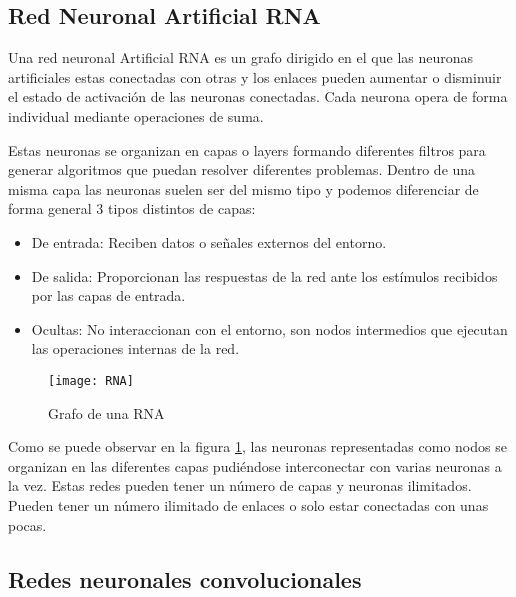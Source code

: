 \subsection{Red Neuronal Artificial RNA}

Una red neuronal Artificial RNA es un grafo dirigido en el que las neuronas artificiales estas conectadas con otras y los enlaces pueden aumentar o disminuir el estado de activación de las neuronas conectadas. Cada neurona opera de forma individual mediante operaciones de suma.\cite{wiki:redesNeuronalesArtificiales}

Estas neuronas se organizan en capas o layers formando diferentes filtros para generar algoritmos que puedan resolver diferentes problemas. Dentro de una misma capa las neuronas suelen ser del mismo tipo y podemos diferenciar de forma general 3 tipos distintos de capas:

\begin{itemize}
	\item{De entrada}: Reciben datos o señales externos del entorno.
	\item{De salida}: Proporcionan las respuestas de la red ante los estímulos recibidos por las capas de entrada.
	\item{Ocultas}: No interaccionan con el entorno, son nodos intermedios que ejecutan las operaciones internas de la red.
\end{itemize}

\begin{figure}[h]
    \begin{center}%
        \begin{center}%
          \texttt{[image: RNA]}%
          \caption{Grafo de una RNA}%
          \label{figRNA}%
        \end{center}%
  	\end{center}%
\end{figure}%

Como se puede observar en la figura \ref{figRNA}, las neuronas representadas como nodos se organizan en las diferentes capas pudiéndose interconectar con varias neuronas a la vez. Estas redes pueden tener un número de capas y neuronas ilimitados. Pueden tener un número ilimitado de enlaces o solo estar conectadas con unas pocas.

\newpage
\subsection{Redes neuronales convolucionales}


